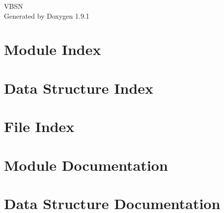 \let\mypdfximage\pdfximage\def\pdfximage{\immediate\mypdfximage}\documentclass[twoside]{book}
\newcommand{\+}{\discretionary{\mbox{\scriptsize$\hookleftarrow$}}{}{}}
\newcommand{\clearemptydoublepage}{%
  \newpage{\pagestyle{empty}\cleardoublepage}%
}
\begin{document}
\raggedbottom

\hypersetup{pageanchor=false,
             bookmarksnumbered=true,
             pdfencoding=unicode
            }
\begin{titlepage}
\vspace*{7cm}
\begin{center}%
{\Large VBSN }\\
\vspace*{1cm}
{\large Generated by Doxygen 1.9.1}\\
\end{center}
\end{titlepage}
\clearemptydoublepage
{}
\tableofcontents
\clearemptydoublepage
{}
\hypersetup{pageanchor=true}

\chapter{Module Index}

\chapter{Data Structure Index}

\chapter{File Index}

\chapter{Module Documentation}








\chapter{Data Structure Documentation}






























\end{document}

